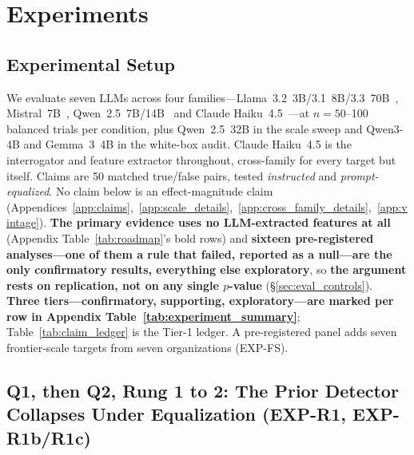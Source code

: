 \section{Experiments}
\label{sec:experiments}

\subsection{Experimental Setup}
\label{sec:setup}

We evaluate seven LLMs across four families---Llama~3.2~3B/3.1~8B/3.3~70B~\citep{meta2024llama3}, Mistral~7B~\citep{jiang2023mistral}, Qwen~2.5~7B/14B~\citep{qwen2025qwen25} and Claude Haiku~4.5~\citep{anthropic2025haiku45}---at $n=50$--100 balanced trials per condition, plus Qwen~2.5~32B in the scale sweep and Qwen3-4B and Gemma~3~4B in the white-box audit. Claude Haiku~4.5 is the interrogator and feature extractor throughout, cross-family for every target but itself. Claims are 50 matched true/false pairs, tested \emph{instructed} and \emph{prompt-equalized}. No claim below is an effect-magnitude claim (Appendices~\ref{app:claims},~\ref{app:scale_details},~\ref{app:cross_family_details},~\ref{app:vintage}). \textbf{The primary evidence uses no LLM-extracted features at all} (Appendix Table~\ref{tab:roadmap}'s bold rows) and \textbf{sixteen pre-registered analyses---one of them a rule that failed, reported as a null---are the only confirmatory results, everything else exploratory}, so \textbf{the argument rests on replication, not on any single $p$-value} (§\ref{sec:eval_controls}). \textbf{Three tiers---confirmatory, supporting, exploratory---are marked per row in Appendix Table~\ref{tab:experiment_summary}}; Table~\ref{tab:claim_ledger} is the Tier-1 ledger. A pre-registered panel adds seven frontier-scale targets from seven organizations (EXP-FS).

\subsection{Q1, then Q2, Rung 1 to 2: The Prior Detector Collapses Under Equalization (EXP-R1, EXP-R1b/R1c)}
\label{sec:r1_faithful}

